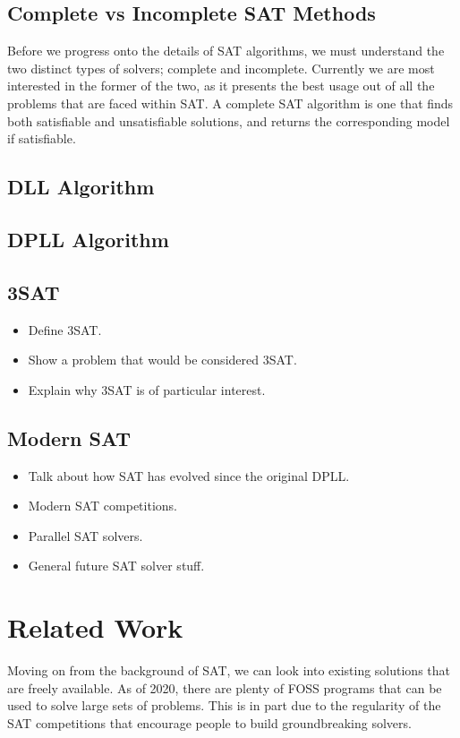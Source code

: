 \documentclass{article}
\begin{document}
\subsection{Complete vs Incomplete SAT Methods}
Before we progress onto the details of SAT algorithms, we must understand the two distinct types of
solvers; complete and incomplete. Currently we are most interested in the former of the two, as it
presents the best usage out of all the problems that are faced within SAT. A complete SAT algorithm
is one that finds both satisfiable and unsatisfiable solutions, and returns the corresponding model
if satisfiable. 

\subsection{DLL Algorithm}
\lipsum[1-2]
\subsection{DPLL Algorithm}
\lipsum[1-2]

\subsection{3SAT}
\begin{itemize}
    \item Define 3SAT.
    \item Show a problem that would be considered 3SAT.
    \item Explain why 3SAT is of particular interest.
\end{itemize}

\subsection{Modern SAT}
\begin{itemize}
    \item Talk about how SAT has evolved since the original DPLL.
    \item Modern SAT competitions.
    \item Parallel SAT solvers.
    \item General future SAT solver stuff.
\end{itemize}

\section{Related Work}
Moving on from the background of SAT, we can look into existing solutions that are freely available.
As of 2020, there are plenty of FOSS programs that can be used to solve large sets of problems. This
is in part due to the regularity of the SAT competitions that encourage people to build
groundbreaking solvers.
\end{document}
